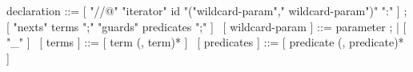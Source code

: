 \begin{syntax}
  declaration ::= [ { "//@" "iterator" id "("wildcard-param"," 
    wildcard-param")" ":" } ] ;
  [ { "nexts" terms ";" "guards" predicates ";" } ]
  \
  [ { wildcard-param } ] ::= { parameter } ;
  | [ { "_" } ]
  \
  [ { terms } ] ::= [ { term (, term)* } ]
  \
  [ { predicates } ] ::= [ { predicate (, predicate)* } ]
\end{syntax}
